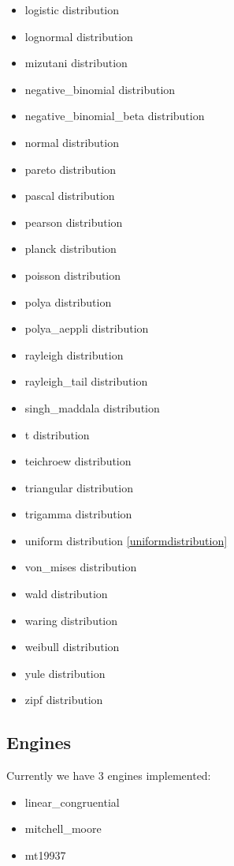 \begin{itemize}
    \item logistic distribution
    \item lognormal distribution
    \item mizutani distribution
    \item negative\_binomial distribution
    \item negative\_binomial\_beta distribution
    \item normal distribution
    \item pareto distribution
    \item pascal distribution
    \item pearson distribution
    \item planck distribution
    \item poisson distribution
    \item polya distribution
    \item polya\_aeppli distribution
    \item rayleigh distribution
    \item rayleigh\_tail distribution
    \item singh\_maddala distribution
    \item t distribution
    \item teichroew distribution
    \item triangular distribution
    \item trigamma distribution
    \item uniform distribution \ref{uniformdistribution}
    \item von\_mises distribution
    \item wald distribution
    \item waring distribution
    \item weibull distribution
    \item yule distribution
    \item zipf distribution
\end{itemize}

\subsection{Engines}
Currently we have 3 engines implemented:
\begin{itemize}
    \item linear\_congruential
    \item mitchell\_moore
    \item mt19937
\end{itemize}



